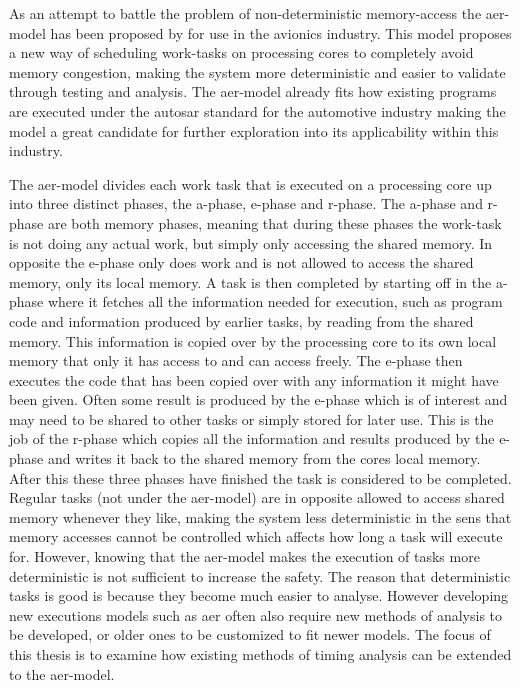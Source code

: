 \documentclass{kththesis}
\begin{document}

As an attempt to battle the problem of non-deterministic memory-access the \acrshort{aer}-model has
been proposed by \textcite{durrieu_predictable_2014} for use in the avionics industry. This model
proposes a new way of scheduling work-tasks on processing cores to completely avoid memory
congestion, making the system more deterministic and easier to validate through testing and
analysis. The \acrshort{aer}-model already fits how existing programs are executed under the
\acrshort{autosar} standard for the automotive industry making the model a great candidate for
further exploration into its applicability within this industry.


The \acrshort{aer}-model divides each work task that is executed on a processing core up into three
distinct phases, the \acrfull{a}-phase, \acrfull{e}-phase and \acrfull{r}-phase. The
\acrshort{a}-phase and \acrshort{r}-phase are both memory phases, meaning that during these phases
the work-task is not doing any actual work, but simply only accessing the shared memory. In opposite the
\acrshort{e}-phase only does work and is not allowed to access the shared memory, only its local
memory. A task is then completed by starting off in the \acrshort{a}-phase where it fetches all the
information needed for execution, such as program code and information produced by earlier tasks,
by reading from the shared memory. This information is copied over by the processing core to its own
local memory that only it has access to and can access freely. The \acrshort{e}-phase then executes
the code that has been copied over with any information it might have been given. Often some result
is produced by the \acrshort{e}-phase which is of interest and may need to be shared to other tasks or
simply stored for later use. This is the job of the \acrshort{r}-phase which copies all the
information and results produced by the \acrshort{e}-phase and writes it back to the shared memory
from the cores local memory. After this these three phases have finished the task is considered to
be completed. Regular tasks (not under the \acrshort{aer}-model) are in opposite allowed to access
shared memory whenever they like, making the system less deterministic in the sens that memory
accesses cannot be controlled which affects how long a task will execute for. However, knowing that
the \acrshort{aer}-model makes the execution of tasks more deterministic is not sufficient to
increase the safety. The reason that deterministic tasks is good is because they become much easier
to analyse. However developing new executions models such as \acrshort{aer} often also require new
methods of analysis to be developed, or older ones to be customized to fit newer models. The focus
of this thesis is to examine how existing methods of timing analysis can be extended to the
\acrshort{aer}-model. 
\end{document}
